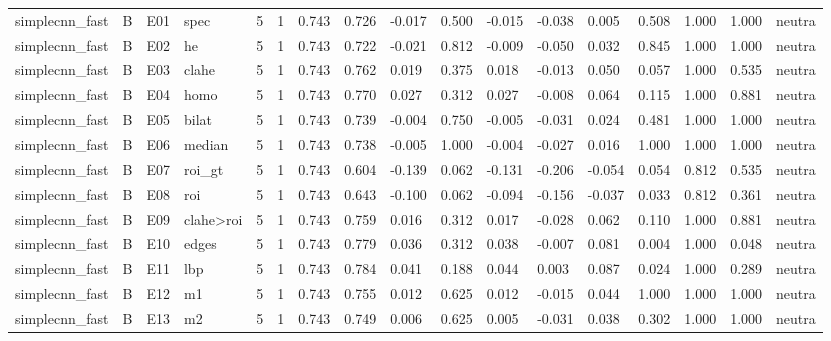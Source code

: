 \begin{table}[ht]
\begin{tabular}{lllllllllllllllll}
simplecnn\_fast & B & E01 & spec & 5 & 1 & 0.743 & 0.726 & -0.017 & 0.500 & -0.015 & -0.038 & 0.005 & 0.508 & 1.000 & 1.000 & neutra \\
simplecnn\_fast & B & E02 & he & 5 & 1 & 0.743 & 0.722 & -0.021 & 0.812 & -0.009 & -0.050 & 0.032 & 0.845 & 1.000 & 1.000 & neutra \\
simplecnn\_fast & B & E03 & clahe & 5 & 1 & 0.743 & 0.762 & 0.019 & 0.375 & 0.018 & -0.013 & 0.050 & 0.057 & 1.000 & 0.535 & neutra \\
simplecnn\_fast & B & E04 & homo & 5 & 1 & 0.743 & 0.770 & 0.027 & 0.312 & 0.027 & -0.008 & 0.064 & 0.115 & 1.000 & 0.881 & neutra \\
simplecnn\_fast & B & E05 & bilat & 5 & 1 & 0.743 & 0.739 & -0.004 & 0.750 & -0.005 & -0.031 & 0.024 & 0.481 & 1.000 & 1.000 & neutra \\
simplecnn\_fast & B & E06 & median & 5 & 1 & 0.743 & 0.738 & -0.005 & 1.000 & -0.004 & -0.027 & 0.016 & 1.000 & 1.000 & 1.000 & neutra \\
simplecnn\_fast & B & E07 & roi\_gt & 5 & 1 & 0.743 & 0.604 & -0.139 & 0.062 & -0.131 & -0.206 & -0.054 & 0.054 & 0.812 & 0.535 & neutra \\
simplecnn\_fast & B & E08 & roi & 5 & 1 & 0.743 & 0.643 & -0.100 & 0.062 & -0.094 & -0.156 & -0.037 & 0.033 & 0.812 & 0.361 & neutra \\
simplecnn\_fast & B & E09 & clahe>roi & 5 & 1 & 0.743 & 0.759 & 0.016 & 0.312 & 0.017 & -0.028 & 0.062 & 0.110 & 1.000 & 0.881 & neutra \\
simplecnn\_fast & B & E10 & edges & 5 & 1 & 0.743 & 0.779 & 0.036 & 0.312 & 0.038 & -0.007 & 0.081 & 0.004 & 1.000 & 0.048 & neutra \\
simplecnn\_fast & B & E11 & lbp & 5 & 1 & 0.743 & 0.784 & 0.041 & 0.188 & 0.044 & 0.003 & 0.087 & 0.024 & 1.000 & 0.289 & neutra \\
simplecnn\_fast & B & E12 & m1 & 5 & 1 & 0.743 & 0.755 & 0.012 & 0.625 & 0.012 & -0.015 & 0.044 & 1.000 & 1.000 & 1.000 & neutra \\
simplecnn\_fast & B & E13 & m2 & 5 & 1 & 0.743 & 0.749 & 0.006 & 0.625 & 0.005 & -0.031 & 0.038 & 0.302 & 1.000 & 1.000 & neutra \\
\bottomrule
\end{tabular}
\end{table}